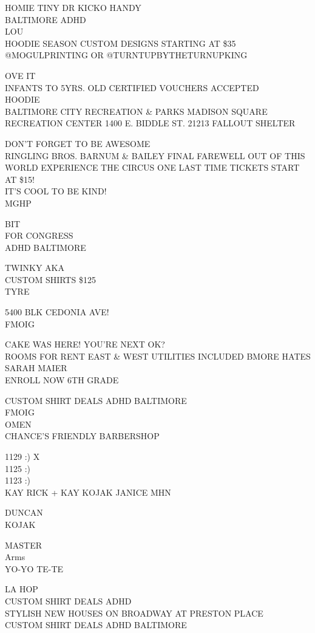\documentclass[10pt,letterpaper]{article}
\begin{document}
HOMIE TINY DR  KICKO HANDY\\
BALTIMORE ADHD\\
LOU\\
HOODIE SEASON CUSTOM DESIGNS STARTING AT \$35 @MOGULPRINTING OR @TURNTUPBYTHETURNUPKING

OVE IT\\
INFANTS TO 5YRS. OLD CERTIFIED VOUCHERS ACCEPTED\\
HOODIE\\
BALTIMORE CITY RECREATION \& PARKS MADISON SQUARE RECREATION CENTER 1400 E. BIDDLE ST. 21213 FALLOUT SHELTER

DON'T FORGET TO BE AWESOME\\
RINGLING BROS. BARNUM \& BAILEY FINAL FAREWELL OUT OF THIS WORLD EXPERIENCE THE CIRCUS ONE LAST TIME TICKETS START AT \$15!\\
IT'S COOL TO BE KIND!\\
MGHP

BIT\\
FOR CONGRESS\\
ADHD BALTIMORE

TWINKY AKA\\
CUSTOM SHIRTS \$125\\
TYRE

5400 BLK CEDONIA AVE!\\
FMOIG

CAKE WAS HERE!  YOU'RE NEXT OK?\\
ROOMS FOR RENT EAST \& WEST UTILITIES INCLUDED BMORE HATES SARAH MAIER\\
ENROLL NOW 6TH GRADE

CUSTOM SHIRT DEALS ADHD BALTIMORE\\
FMOIG\\
OMEN\\
CHANCE'S FRIENDLY BARBERSHOP

1129 :) X\\
1125 :)\\
1123 :)\\
KAY RICK + KAY KOJAK JANICE MHN

DUNCAN\\
KOJAK

MASTER\\
Arms\\
YO{-}YO TE{-}TE

LA HOP\\
CUSTOM SHIRT DEALS ADHD\\
STYLISH NEW HOUSES ON BROADWAY AT PRESTON PLACE\\
CUSTOM SHIRT DEALS ADHD BALTIMORE
\end{document}
